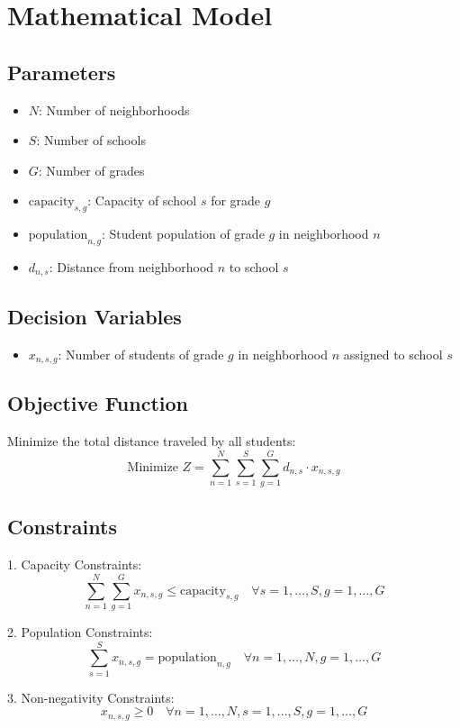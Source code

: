 \documentclass{article}
\begin{document}
\section*{Mathematical Model}

\subsection*{Parameters}
\begin{itemize}
    \item \( N \): Number of neighborhoods
    \item \( S \): Number of schools
    \item \( G \): Number of grades
    \item \( \text{capacity}_{s,g} \): Capacity of school \( s \) for grade \( g \)
    \item \( \text{population}_{n,g} \): Student population of grade \( g \) in neighborhood \( n \)
    \item \( d_{n,s} \): Distance from neighborhood \( n \) to school \( s \)
\end{itemize}

\subsection*{Decision Variables}
\begin{itemize}
    \item \( x_{n,s,g} \): Number of students of grade \( g \) in neighborhood \( n \) assigned to school \( s \)
\end{itemize}

\subsection*{Objective Function}
Minimize the total distance traveled by all students:
\[
\text{Minimize } Z = \sum_{n=1}^{N} \sum_{s=1}^{S} \sum_{g=1}^{G} d_{n,s} \cdot x_{n,s,g}
\]

\subsection*{Constraints}
1. Capacity Constraints:
\[
\sum_{n=1}^{N} \sum_{g=1}^{G} x_{n,s,g} \leq \text{capacity}_{s,g} \quad \forall s = 1, \ldots, S, g = 1, \ldots, G
\]

2. Population Constraints:
\[
\sum_{s=1}^{S} x_{n,s,g} = \text{population}_{n,g} \quad \forall n = 1, \ldots, N, g = 1, \ldots, G
\]

3. Non-negativity Constraints:
\[
x_{n,s,g} \geq 0 \quad \forall n = 1, \ldots, N, s = 1, \ldots, S, g = 1, \ldots, G
\]
\end{document}

